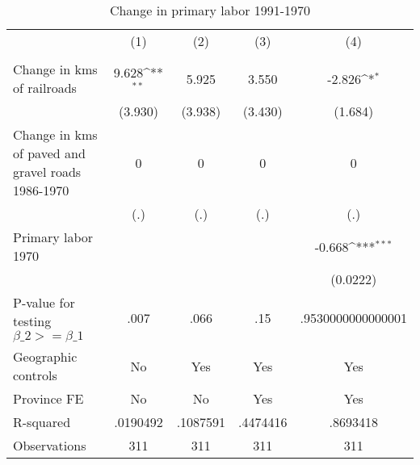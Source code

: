 \begin{table}[htbp]\centering
\def\sym#1{\ifmmode^{#1}\else\(^{#1}\)\fi}
\caption{Change in primary labor 1991-1970}
\begin{tabular}{l*{4}{c}}
\hline\hline
                &\multicolumn{1}{c}{(1)}&\multicolumn{1}{c}{(2)}&\multicolumn{1}{c}{(3)}&\multicolumn{1}{c}{(4)}\\
                &\multicolumn{1}{c}{}&\multicolumn{1}{c}{}&\multicolumn{1}{c}{}&\multicolumn{1}{c}{}\\
\hline
Change in kms of railroads&    9.628\sym{**} &    5.925         &    3.550         &   -2.826\sym{*}  \\
                &  (3.930)         &  (3.938)         &  (3.430)         &  (1.684)         \\
[1em]
Change in kms of paved and gravel roads 1986-1970&        0         &        0         &        0         &        0         \\
                &      (.)         &      (.)         &      (.)         &      (.)         \\
[1em]
Primary labor 1970&                  &                  &                  &   -0.668\sym{***}\\
                &                  &                  &                  & (0.0222)         \\
\hline
P-value for testing $\beta\_{2} >= \beta\_{1}$&     .007         &     .066         &      .15         &.9530000000000001         \\
Geographic controls&       No         &      Yes         &      Yes         &      Yes         \\
Province FE     &       No         &       No         &      Yes         &      Yes         \\
R-squared       & .0190492         & .1087591         & .4474416         & .8693418         \\
Observations    &      311         &      311         &      311         &      311         \\
\hline\hline
\end{tabular}
\end{table}
